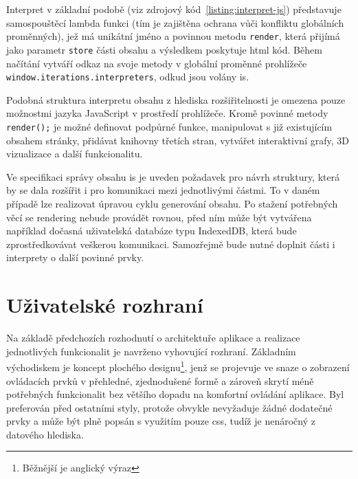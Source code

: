 Interpret v základní podobě (viz zdrojový kód~\ref{listing:interpret-js}) představuje samospouštěcí lambda funkci (tím je zajištěna ochrana vůči konfliktu globálních proměnných), jež má unikátní jméno a povinnou metodu \texttt{render}, která přijímá jako parametr \texttt{store} části obsahu a výsledkem poskytuje \gls{html} kód. Během načítání vytváří odkaz na svoje metody v globální proměnné prohlížeče \texttt{window.iterations.interpreters}, odkud jsou volány \gls{is}.

Podobná struktura interpretu obsahu z hlediska rozšiřitelnosti je omezena pouze možnostmi jazyka JavaScript v prostředí prohlížeče. Kromě povinné metody \texttt{render();} je možné definovat podpůrné funkce, manipulovat s již existujícím obsahem stránky, přidávat knihovny třetích stran, vytvářet interaktivní grafy, 3D vizualizace a další funkcionalitu.

Ve specifikaci správy obsahu \gls{is} je uveden požadavek pro návrh struktury, která by se dala rozšířit i pro komunikaci mezi jednotlivými částmi. To v daném případě lze realizovat úpravou cyklu generování obsahu. Po stažení potřebných věcí se rendering nebude provádět rovnou, před ním může být vytvářena například dočasná uživatelská databáze typu IndexedDB, která bude zprostředkovávat veškerou komunikaci. Samozřejmě bude nutné doplnit části i interprety o další povinné prvky.



\clearpage
\section{Uživatelské rozhraní}

Na základě předchozích rozhodnutí o architektuře aplikace a realizace jednotlivých funkcionalit je navrženo vyhovující rozhraní. Základním východiskem je koncept plochého designu\footnote{Běžnější je anglický výraz }, jenž se projevuje ve snaze o zobrazení ovládacích prvků v přehledné, zjednodušené formě a zároveň skrytí méně potřebných funkcionalit bez většího dopadu na komfortní ovládání aplikace. Byl preferován před ostatními styly, protože obvykle nevyžaduje žádné dodatečné prvky a může být plně popsán s využitím pouze \gls{css}, tudíž je nenáročný z datového hlediska.

